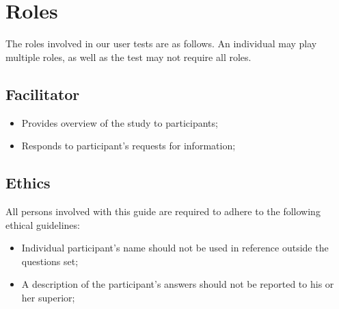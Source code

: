 
\section{Roles}
\label{sec:sec004}

The roles involved in our user tests are as follows. An individual may play multiple roles, as well as the test may not require all roles.

\subsection{Facilitator}

\begin{itemize}
\item Provides overview of the study to participants;
\item Responds to participant's requests for information;
\end{itemize}

\subsection{Ethics}

All persons involved with this guide are required to adhere to the following ethical guidelines:

\begin{itemize}
\item Individual participant's name should not be used in reference outside the questions set;
\item A description of the participant's answers should not be reported to his or her superior;
\end{itemize}

